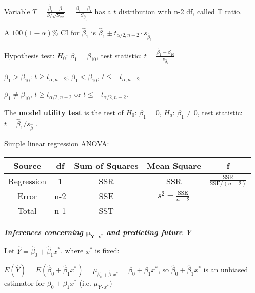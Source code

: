 \documentclass{article}
\newcommand{\smalltitle}[1]{
	\noindent
	\textbf{\textit{#1}}
}
\begin{document}
	
	Variable $T = \frac { \hat { \beta } _ { 1 } - \beta _ { 1 } } { S / \sqrt { S _ { x x } } } = \frac { \hat { \beta } _ { 1 } - \beta _ { 1 } } { S _ { \hat { \beta } _ { 1 } } }$ has a $t$ distribution with n-2 df, called T ratio.
	
	A $100(1-\alpha)\%$ CI for $\hat{ \beta }_1$ is $\hat { \beta } _ { 1 } \pm t _ { \alpha / 2 , n - 2 } \cdot s _ { \hat { \beta } _ { 1 } }$
	
	Hypothesis test: $H_0$: $\beta_1 = \beta_{10}$, test statistic: $t = \frac { \hat { \beta } _ { 1 } - \beta _ { 10 } } { s _ { \hat { \beta } _ { 1 } } }$
	
	$\beta _ { 1 } > \beta _ { 10 }$: $t \geq t _ { \alpha , n - 2 }$; $\beta _ { 1 } < \beta _ { 10 }$, $t \leq - t _ { \alpha , n - 2 }$
	
	$\beta _ { 1 } \neq \beta _ { 10 }$, $t \geq t _ { \alpha / 2 , n - 2 }$ or $t \leq - t _ { \alpha / 2 , n - 2 }$.
	
	The \textbf{model utility test} is the test of $H_0$: $\beta_1 = 0$, $H_a$: $\beta_1 \neq 0$, test statistic: $t= \hat{\beta}_1/s_{\hat{\beta}_1}$.
	
	Simple linear regression ANOVA:
	
	
	\begin{table}[htb]
		\vspace{-2ex}
		\begin{tabular}{ccccc}
			\hline
			Source & df     & Sum of Squares & Mean Square & f        \\\hline
			Regression         & 1    & SSR           & SSR       & $\frac{\mathrm{SSR}}{\mathrm{SSE}/(n-2)}$ \\
			Error              & n-2 & SSE            & $s^{2}=\frac{\mathrm{SSE}}{n-2}$ &         \\
			Total              & n-1   & SST            &             &         \\
			\hline
		\end{tabular}
	\vspace{-1em}
	\end{table}
	
	
	\smalltitle{Inferences concerning $\mathbf{\mu_{Y\cdot x^*}}$ and predicting future Y}
	
	Let $\hat { Y } = \hat { \beta } _ { 0 } + \hat { \beta } _ { 1 } x ^ { * }$, where $x^*$ is fixed:
	
	$E ( \hat { Y } ) = E \left( \hat { \beta } _ { 0 } + \hat { \beta } _ { 1 } x ^ { * } \right) = \mu _ { \hat { \beta } _ { 0 } + \hat { \beta } _ { 1 } x ^ { * } } = \beta _ { 0 } + \beta _ { 1 } x ^ { * }$, so $\hat { \beta } _ { 0 } + \hat { \beta } _ { 1 } x ^ { * }$ is an unbiased estimator for $\beta _ { 0 } + \beta _ { 1 } x ^ { * }$ (i.e. $\mu _ { Y \cdot x ^ { * } }$)
	
\end{document}
